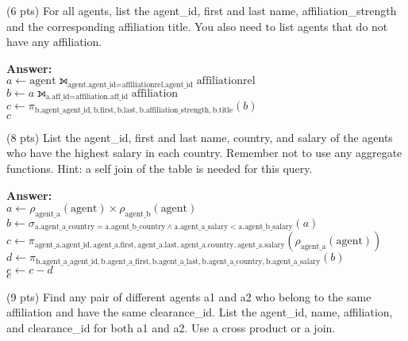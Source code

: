 \begin{questions}
\question (6 pts) For all agents, list the agent\_id, first and last name, affiliation\_strength and the corresponding affiliation title. You also need to list agents that do not have any affiliation.

\textbf{Answer:}  \\
$a \leftarrow \text{agent} \leftouterjoin_{\text{agent.agent\_id} = \text{affiliationrel.agent\_id}} \text{affiliationrel}$ \\
$b \leftarrow a \leftouterjoin_{\text{a.aff\_id} = \text{affiliation.aff\_id}} \text{affiliation}$ \\
$c \leftarrow \pi_{\text{b.agent\_agent\_id}, \text{b.first}, \text{b.last}, \text{b.affiliation\_strength}, \text{b.title}}(b)$ \\
$c$
\vspace{15 mm}

\question (8 pts) List the agent\_id, first and last name, country, and salary of the agents who have the highest salary in each country. 
Remember not to use any aggregate functions. Hint: a self join of the table is needed for this query.

\textbf{Answer:} \\
$a \leftarrow \rho_{\text{agent\_a}}(\text{agent}) \times \rho_{\text{agent\_b}}(\text{agent})$\\
$b \leftarrow \sigma_{\text{a.agent\_a\_country} = \text{a.agent\_b\_country} \land \text{a.agent\_a\_salary} < \text{a.agent\_b\_salary}}(a)$\\
$c \leftarrow \pi_{\text{agent\_a.agent\_id}, \text{agent\_a.first}, \text{agent\_a.last}, \text{agent\_a.country}, \text{agent\_a.salary}}(\rho_{\text{agent\_a}}(\text{agent}))$\\
$d \leftarrow \pi_{\text{b.agent\_a\_agent\_id}, \text{b.agent\_a\_first}, \text{b.agent\_a\_last}, \text{b.agent\_a\_country}, \text{b.agent\_a\_salary}}(b)$\\
$e \leftarrow c - d$\\
$e$

\vspace{15 mm}

\question (9 pts) Find any pair of different agents a1 and a2 who belong to the same affiliation and have the same clearance\_id. List the agent\_id, name, affiliation, and clearance\_id for both a1 and a2. 
Use a cross product or a join.


\end{questions}
